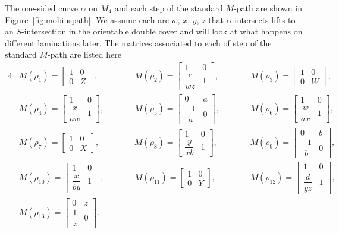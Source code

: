 \documentclass[10pt,a4paper]{amsart}
\numberwithin{equation}{section}
\theoremstyle{definition}
\begin{document}
The one-sided curve $\alpha$ on $M_4$ and each step of the
standard $M$-path are shown in Figure~\ref{fig:mobiuspath}. We assume each arc $w$, $x$, $y$, $z$ that $\alpha$ intersects lifts to an $S$-intersection in the orientable double cover and will look at what happens on different laminations later. The matrices associated to each of step of the standard $M$-path are listed here
\begin{alignat*}{4}
& M( \rho _{1}) = \begin{bmatrix}
1 & 0\\
0 & Z
\end{bmatrix} ,\qquad&& M( \rho _{2}) = \begin{bmatrix}
1 & 0\\
\dfrac{c}{wz} & 1
\end{bmatrix} ,\qquad &&M( \rho _{3}) = \begin{bmatrix}
1 & 0\\
0 & W
\end{bmatrix} ,&\\ &M( \rho _{4}) = \begin{bmatrix}
1 & 0\\
\dfrac{x}{aw} & 1
\end{bmatrix} ,
\qquad&&
M( \rho _{5}) = \begin{bmatrix}
0 & a\\
\dfrac{-1}{a} & 0
\end{bmatrix} ,\qquad&& M( \rho _{6}) = \begin{bmatrix}
1 & 0\\
\dfrac{w}{ax} & 1
\end{bmatrix} ,&\\ &M( \rho _{7}) = \begin{bmatrix}
1 & 0\\
0 & X
\end{bmatrix} ,\qquad&& M( \rho _{8}) = \begin{bmatrix}
1 & 0\\
\dfrac{y}{xb} & 1
\end{bmatrix} ,
\qquad&&
M( \rho _{9}) = \begin{bmatrix}
0 & b\\
\dfrac{-1}{b} & 0
\end{bmatrix} ,&\\ &M( \rho _{10}) = \begin{bmatrix}
1 & 0\\
\dfrac{x}{by} & 1
\end{bmatrix} ,\qquad&& M( \rho _{11}) = \begin{bmatrix}
1 & 0\\
0 & Y
\end{bmatrix} ,\qquad&& M( \rho _{12}) = \begin{bmatrix}
1 & 0\\
\dfrac{d}{yz} & 1
\end{bmatrix} ,&
\\
 &M( \rho _{13}) = \begin{bmatrix}
0 & z\\
\dfrac{1}{z} & 0
\end{bmatrix}.&&&&&
\end{alignat*}
\end{document}
